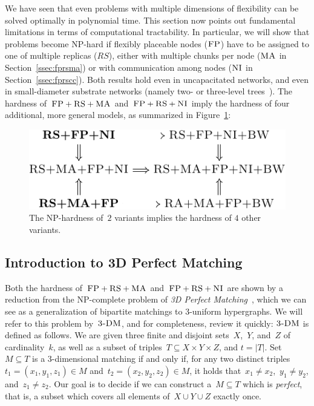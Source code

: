 We have seen that even problems with multiple dimensions of
flexibility can be solved optimally in polynomial time.
This section now points out fundamental
limitations in terms of computational tractability.
In particular, we
will show that problems become NP-hard if flexibly placeable nodes ($\textsc{FP}$) have to be assigned to one of multiple replicas ($RS$), either with multiple chunks per node ($\textsc{MA}$ in Section~\ref{ssec:fprsma}) or with communication among nodes ($\textsc{NI}$ in Section~\ref{ssec:fprscc}).
Both results hold even in uncapacitated networks, and even in small-diameter
substrate networks (namely two- or three-level trees~\cite{fattree}).
The hardness of~$\textsc{FP}+\textsc{RS}+\textsc{MA}$ and~$\textsc{FP}+\textsc{RS}+\textsc{NI}$ imply
the hardness of four additional, more general models, as
summarized in Figure~\ref{fig:np_implications}:\\
\begin{figure}[htbp]
\centering
\includegraphics[width = .6\columnwidth]{figs/static-mapping/np_implications}
\caption{The NP-hardness of~$2$ variants implies the hardness of 
$4$ other variants.}
\label{fig:np_implications}
\end{figure}

\subsection{Introduction to 3D Perfect Matching}
\label{sec:3dm_intro}

Both the hardness of~$\textsc{FP}+\textsc{RS}+\textsc{MA}$ and~$\textsc{FP}+\textsc{RS}+\textsc{NI}$ are shown by a reduction
from the NP-complete problem of \emph{3D Perfect Matching}~\cite{3dmatch},
which we can see as a generalization of bipartite matchings to 3-uniform
hypergraphs. We will refer to this problem by~$\textsc{3-DM}$, and for completeness,
review it quickly:
$\textsc{3-DM}$ is defined as follows. We are given three finite and disjoint
sets~$X$,~$Y$, and~$Z$ of cardinality~$k$, as well as a subset of triples~$T\subseteq
X \times Y \times Z$, and $t=|T|$.  Set~$M \subseteq T$ is a 3-dimensional matching
if and only if, for any two distinct triples~$t_1=(x_1, y_1, z_1) \in M$
and~$t_2=(x_2, y_2, z_2) \in M$, it holds that~$x_1\neq x_2$,~$y_1\neq
y_2$, and~$z_1\neq z_2$. Our goal is to decide if we can construct
a~$M \subseteq T$ which is \emph{perfect}, that is, a subset which covers all
elements of~$X \cup Y \cup Z$ exactly once.


